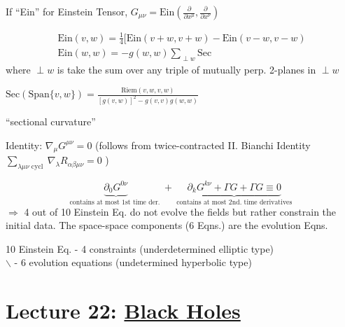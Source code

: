\documentclass[10pt, twoside]{amsart}
\begin{document}
\begin{multicols*}{2}
If ``Ein'' for Einstein Tensor, $G_{\mu \nu} = \text{Ein}\left( \frac{ \partial }{ \partial x^{\mu }}, \frac{ \partial }{ \partial x^{\nu }} \right)$

\[
\begin{gathered}
  \text{Ein}(v,w) = \frac{1}{4} [ \text{Ein}(v+w,v+w) - \text{Ein}(v-w,v-w)  \\
  \text{Ein}(w,w) = -g(w,w) \sum_{\perp w } \text{Sec}
\end{gathered}
\]
where $\perp w$ is take the sum over any triple of mutually perp. 2-planes in $\perp w$

$\text{Sec}(\text{Span}\lbrace v,w \rbrace) = \frac{ \text{Riem}(v,w,v,w) }{ [g(v,w)]^2 - g(v,v)g(w,w) }$

``sectional curvature''

Identity: $\nabla_{\mu} G^{\mu \nu} =0$ (follows from twice-contracted II. Bianchi Identity \\
 $\sum_{\lambda \mu \nu \text{ cycl } } \nabla_{\lambda} R_{\alpha \beta \mu \nu } = 0 $ )

\[
\underbrace{ \partial_0 G^{0\nu} }_{\text{contains at most 1st time der. }} + \underbrace{ \partial_k G^{k\nu} + \Gamma G  + \Gamma G \equiv0 }_{\text{ contains at most 2nd. time derivatives }}
\]
$\Longrightarrow$ 4 out of 10 Einstein Eq. do not evolve the fields but rather constrain the initial data. The space-space components (6 Eqns.) are the evolution Eqns.  

10 Einstein Eq. - 4 constraints (underdetermined elliptic type) \\
\phantom{10 Einstein Eq.\quad \, } $\backslash$ - 6 evolution equations (undetermined hyperbolic type)

\section{}

\section{}

\section{}

\section{Lecture 22: \underline{Black Holes}}


\end{multicols*}
\end{document}
